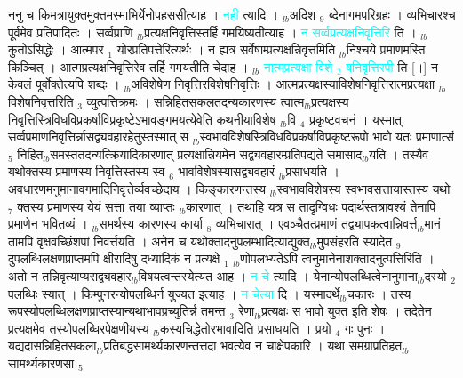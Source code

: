 \documentclass[article,12pt,a4paper]{memoir}%
\newcommand{\quotelemma}[1]{\textcolor{cyan}{#1}}
\begin{document}
	  
	  \pstart \leavevmode%
	\hphantom{.}ननु च किमत्रायुक्तमुक्तमस्माभिर्येनोपहससीत्याह । \quotelemma{नही} \cite[4a8]{vn-msN} त्यादि । {\tiny $_{lb}$}अदिश {\tiny $_{9}$} \leavevmode{} ब्देनागमपरिग्रहः । व्यभिचारश्च पूर्वमेव प्रतिपादितः । सर्व्वप्राणि {\tiny $_{lb}$}प्रत्यक्षनिवृत्तिस्तर्हि गमयिष्यतीत्याह । \quotelemma{न सर्व्वप्रत्यक्षनिवृत्तिरि} \cite[4a8]{vn-msN} ति । {\tiny $_{lb}$} \leavevmode{} कुतोऽसिद्धेः । आत्मपर {\tiny $_{1}$} योरप्रतिपत्तेरित्यर्थः । न ह्यत्र सर्वेषाम्प्रत्यक्षन्निवृत्तमिति {\tiny $_{lb}$}निश्चये प्रमाणमस्ति किञ्चित् । आत्मप्रत्यक्षनिवृत्तिरेव तर्हि गमयतीति चेदाह । {\tiny $_{lb}$} \quotelemma{नात्मप्रत्यक्षा विशे {\tiny $_{2}$} षनिवृत्तिरपी} \cite[4a8]{vn-msN} ति [।] न केवलं पूर्वोक्तेत्यपि शब्दः । {\tiny $_{lb}$}अविशेषेण निवृत्तिरविशेषनिवृत्तिः । आत्मप्रत्यक्षस्याविशेषनिवृत्तिरात्मप्रत्यक्षा {\tiny $_{lb}$}विशेषनिवृत्तरिति {\tiny $_{3}$} व्युत्पत्तिक्रमः । सन्निहितसकलतदन्यकारणस्य त्वात्म{\tiny $_{lb}$}प्रत्यक्षस्य निवृत्तिस्त्रिविधविप्रकर्षाविप्रकृष्टेऽभावङ्गमयत्येवेति कथनीयाविशेष {\tiny $_{lb}$}वि {\tiny $_{4}$} प्रकृष्टवचनं । यस्मात् सर्व्वप्रमाणनिवृत्तिर्न्नासद्व्यवहारहेतुस्तस्मात् स {\tiny $_{lb}$}स्वभावविशेषस्त्रिविधविप्रकर्षाविप्रकृष्टरूपो भावो यतः प्रमाणात्सं {\tiny $_{5}$} निहित{\tiny $_{lb}$}समस्ततदन्यत्क्रियादिकारणात् प्रत्यक्षान्नियमेन सद्व्यवहारम्प्रतिपद्यते समासाद{\tiny $_{lb}$}यति । तस्यैव यथोक्तस्य प्रमाणस्य निवृत्तिस्तस्य स्व {\tiny $_{6}$} भावविशेषस्यासद्व्यवहारं {\tiny $_{lb}$}प्रसाधयति । अवधारणमनुमानावगमादिनिवृत्तेर्व्यवच्छेदाय । किङ्कारणन्तस्य {\tiny $_{lb}$}स्वभावविशेषस्य स्वभावसत्तायास्तस्य यथो {\tiny $_{7}$} क्तस्य प्रमाणस्य येयं सत्ता तया व्याप्तः {\tiny $_{lb}$}कारणात् । तथाहि यत्र स तादृग्विधः पदार्थस्तत्रावश्यं तेनापि प्रमाणेन भवितव्यं । {\tiny $_{lb}$}समर्थस्य कारणस्य कार्या {\tiny $_{8}$} व्यभिचारात् । एवञ्चैतत्प्रमाणं तद्व्यापकत्वान्निवर्त्त{\tiny $_{lb}$}मानं तामपि वृक्षवच्छिंशपां निवर्त्तयति । अनेन च यथोक्तादनुपलम्भादित्याद्युक्त{\tiny $_{lb}$}मुपसंहरति स्यादेत {\tiny $_{9}$} \leavevmode{} दुपलब्धिलक्षणप्राप्तमपि क्षीरादिषु दध्यादिकं न प्रत्यक्षे {\tiny $_{1}$} {\tiny $_{lb}$}णोपलभ्यतेऽपि त्वनुमानेनाशक्तादनुत्पत्तिरिति । अतो न तन्निवृत्याप्यसद्व्यवहार{\tiny $_{lb}$}विषयत्वन्तस्येत्यत आह । \quotelemma{न चे} \cite[4a9]{vn-msN} त्यादि । येनान्योपलब्धित्वेनानुमाना{\tiny $_{lb}$}दस्यो {\tiny $_{2}$} पलब्धिः स्यात् । किम्पुनरन्योपलब्धिर्न युज्यत इत्याह । \quotelemma{न चेत्या} दि । यस्मादर्थे{\tiny $_{lb}$}चकारः । तस्य रूपस्योपलब्धिलक्षणप्राप्तस्यान्यथाभावप्रच्युतिर्न्न तमन्त {\tiny $_{3}$} रेणा{\tiny $_{lb}$}प्रत्यक्षः स भावो युक्त इति शेषः । तदेतेन प्रत्यक्षमेव तस्योपलब्धिरपेक्षणीयस्य {\tiny $_{lb}$}कस्यचिद्धेतोरभावादिति प्रसाधयति । प्रयो {\tiny $_{4}$} गः पुनः । यद्यदासन्निहितसकला{\tiny $_{lb}$}प्रतिबद्धसामर्थ्यकारणन्तत्तदा भवत्येव न चाक्षेपकारि । यथा समग्राप्रतिहत{\tiny $_{lb}$}सामर्थ्यकारणसा {\tiny $_{5}$} 
\end{document}
